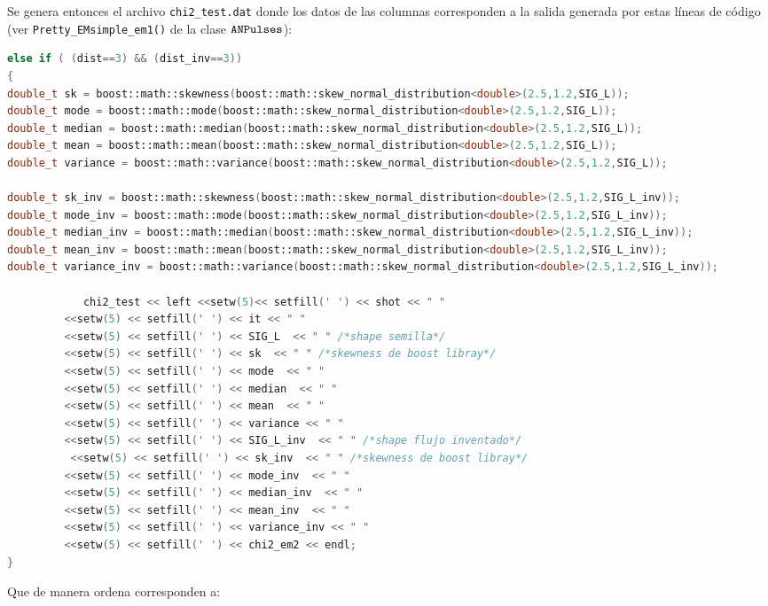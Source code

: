 \documentclass[11pt,letterpaper]{article}
\begin{document}
Se genera entonces el archivo \verb|chi2_test.dat| donde los datos de las columnas corresponden a la salida generada por estas líneas de código (ver \verb|Pretty_EMsimple_em1()| de la clase $\verb|ANPulses|$):

\begin{lstlisting}[language=c++]
else if ( (dist==3) && (dist_inv==3))
{
double_t sk = boost::math::skewness(boost::math::skew_normal_distribution<double>(2.5,1.2,SIG_L));
double_t mode = boost::math::mode(boost::math::skew_normal_distribution<double>(2.5,1.2,SIG_L));
double_t median = boost::math::median(boost::math::skew_normal_distribution<double>(2.5,1.2,SIG_L));
double_t mean = boost::math::mean(boost::math::skew_normal_distribution<double>(2.5,1.2,SIG_L));
double_t variance = boost::math::variance(boost::math::skew_normal_distribution<double>(2.5,1.2,SIG_L));

double_t sk_inv = boost::math::skewness(boost::math::skew_normal_distribution<double>(2.5,1.2,SIG_L_inv));
double_t mode_inv = boost::math::mode(boost::math::skew_normal_distribution<double>(2.5,1.2,SIG_L_inv));
double_t median_inv = boost::math::median(boost::math::skew_normal_distribution<double>(2.5,1.2,SIG_L_inv));
double_t mean_inv = boost::math::mean(boost::math::skew_normal_distribution<double>(2.5,1.2,SIG_L_inv));
double_t variance_inv = boost::math::variance(boost::math::skew_normal_distribution<double>(2.5,1.2,SIG_L_inv));

            chi2_test << left <<setw(5)<< setfill(' ') << shot << " "
         <<setw(5) << setfill(' ') << it << " "
         <<setw(5) << setfill(' ') << SIG_L  << " " /*shape semilla*/        
         <<setw(5) << setfill(' ') << sk  << " " /*skewness de boost libray*/
         <<setw(5) << setfill(' ') << mode  << " "
         <<setw(5) << setfill(' ') << median  << " "
         <<setw(5) << setfill(' ') << mean  << " "
         <<setw(5) << setfill(' ') << variance << " "
         <<setw(5) << setfill(' ') << SIG_L_inv  << " " /*shape flujo inventado*/
          <<setw(5) << setfill(' ') << sk_inv  << " " /*skewness de boost libray*/
         <<setw(5) << setfill(' ') << mode_inv  << " "
         <<setw(5) << setfill(' ') << median_inv  << " "
         <<setw(5) << setfill(' ') << mean_inv  << " "
         <<setw(5) << setfill(' ') << variance_inv << " "
         <<setw(5) << setfill(' ') << chi2_em2 << endl;
}
\end{lstlisting}

Que de manera ordena corresponden a:
\end{document}
